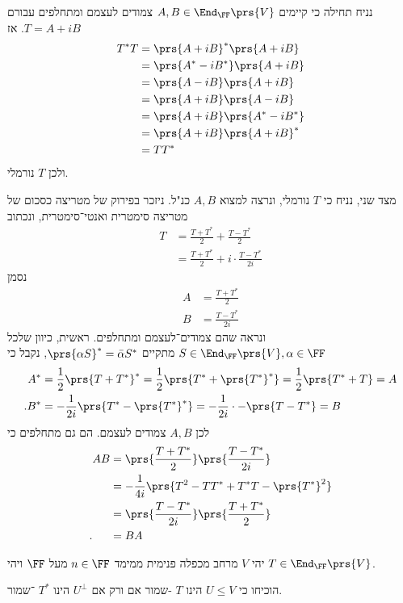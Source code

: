 \documentclass[a4paper,10pt,twoside,openany]{book}
\begin{document}
\begin{solution}
נניח תחילה כי קיימים
$A,B \in \End_\FF\prs{V}$
צמודים לעצמם ומתחלפים עבורם
$T = A+iB$.
אז
\begin{align*}
T^* T &= \prs{A+iB}^* \prs{A + iB}
\\&=
\prs{A^* - iB^*} \prs{A + iB}
\\&=
\prs{A - iB} \prs{A + iB}
\\&=
\prs{A + iB} \prs{A - iB}
\\&=
\prs{A + iB} \prs{A^* - iB^*}
\\&=
\prs{A + iB} \prs{A + iB}^*
\\&=
T T^*
\end{align*}
ולכן
$T$
נורמלי.

מצד שני, נניח כי
$T$
נורמלי, ונרצה למצוא
$A,B$
כנ"ל.
ניזכר בפירוק של מטריצה כסכום של מטריצה סימטרית ואנטי־סימטרית, ונכתוב
\begin{align*}
T &= \frac{T + T^*}{2} + \frac{T - T^*}{2}
\\&= \frac{T + T^*}{2} + i \cdot \frac{T - T^*}{2i}
\end{align*}
נסמן
\begin{align*}
A &= \frac{T + T^*}{2} \\
B &= \frac{T - T^*}{2i}
\end{align*}
ונראה שהם צמודים־לעצמם ומתחלפים.
ראשית, כיוון שלכל
$S \in \End_\FF\prs{V}, \alpha \in \FF$
מתקיים
$\prs{\alpha S}^* = \bar{\alpha} S^*$,
נקבל כי
\begin{align*}
A^* &= \frac{1}{2} \prs{T + T^*}^* = \frac{1}{2} \prs{T^* + \prs{T^*}^*} = \frac{1}{2} \prs{T^* + T} = A \\
\text{.} B^* &= -\frac{1}{2i} \prs{T^* - \prs{T^*}^*} = -\frac{1}{2i} \cdot -\prs{T - T^*} = B
\end{align*}
לכן
$A,B$
צמודים לעצמם.
הם גם מתחלפים כי
\begin{align*}
AB &= \prs{\frac{T + T^*}{2}}\prs{\frac{T - T^*}{2i}}
\\&= -\frac{1}{4i} \prs{T^2 - TT^* + T^*T -\prs{T^*}^2}
\\&= \prs{\frac{T - T^*}{2i}}\prs{\frac{T + T^*}{2}}
\\\text{.} \hphantom{AB} &= BA
\end{align*}
\end{solution}

\begin{exercisechap}
יהי
$V$
מרחב מכפלה פנימית ממימד
$n \in \FF$
מעל
$\FF$
ויהי
$T \in \End_\FF\prs{V}$.

הוכיחו כי
$U \leq V$
הינו
$T$%
-שמור אם ורק אם
$U^\perp$
הינו
$T^*$%
־שמור.
\end{exercisechap}
\end{document}
